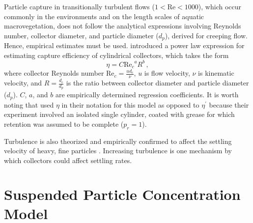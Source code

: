 \documentclass{scrreprt}
\newcommand\Rey{\mathrm{Re}}
\begin{document}
Particle capture in transitionally turbulent flows ($1<\Rey<1000$), which occur commonly in the environments and on the length scales of aquatic macrovegetation, does not follow the analytical expressions involving Reynolds number, collector diameter, and particle diameter ($d_p$), derived for creeping flow. Hence, empirical estimates must be used. \cite{Palmer_2004} introduced a power law expression for estimating capture efficiency of cylindrical collectors, which takes the form 
\begin{equation}
    \eta=C{\Rey_c}^{a}R^{b}\,,
    \label{eq:powerlaw}
\end{equation}
where collector Reynolds number $\Rey_c=\frac{ud_c}{\nu}$, $u$ is flow velocity, $\nu$ is kinematic velocity, and $R=\frac{d_c}{d_p}$ is the ratio between collector diameter and particle diameter ($d_p$). $C$, $a$, and $b$ are empirically determined regression coefficients. It is worth noting that \cite{Palmer_2004} used $\eta$ in their notation for this model as opposed to $\eta^\prime$ because their experiment involved an isolated single cylinder, coated with grease for which retention was assumed to be complete ($p_r = 1$).

Turbulence is also theorized and empirically confirmed to affect the settling velocity of heavy, fine particles \citep{Nielsen_1993, Jacobs_2016, Wang_2018}. Increasing turbulence is one mechanism by which collectors could affect settling rates.

\section{Suspended Particle Concentration Model}
\end{document}
